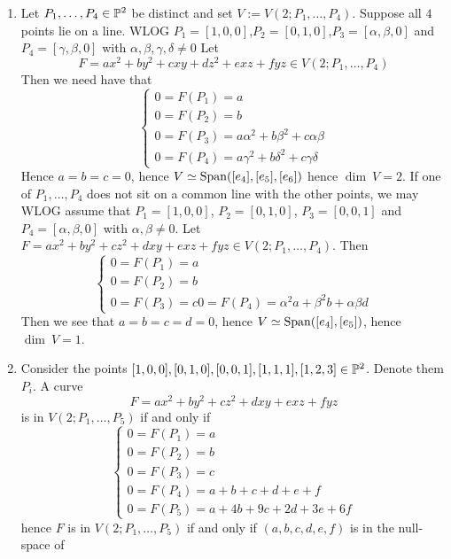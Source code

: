     \begin{example}
        \begin{enumerate}
            \item Let $P_1,\dots,P_4\in \mathbb{P}^2$ be distinct and set $V:= V(2; P_1,\dots,P_4)$. Suppose all $4$ points lie on a line. WLOG $P_1=[1,0,0]$,$P_2=[0,1,0]$,$P_3=[\alpha ,\beta ,0]$ and $P_4=[\gamma,\beta,0]$ with $\alpha,\beta,\gamma,\delta \neq 0$ Let 
            $$F=ax^2+by^2+cxy+dz^2+exz+fyz\in V(2;P_1,\dots,P_4)$$
            Then we need have that 
            $$\begin{cases}
                0=F(P_1)= a\\
                0=F(P_2)= b\\
                0=F(P_3)= a\alpha^2+b\beta^2+c\alpha\beta\\
                0=F(P_4)= a\gamma^2+b\delta^2+c\gamma\delta
            \end{cases}$$
            Hence $a=b=c=0$, hence $V\simeq \mathrm{Span}([e_4],[e_5],[e_6])$ hence $\dim \ V = 2$. 
            If one of $P_1,\dots,P_4$ does not sit on a common line with the other points, we may WLOG assume that $P_1 = [1,0,0]$, $P_2=[0,1,0]$, $P_3 = [0,0,1]$ and $P_4 = [\alpha,\beta,0]$ with $\alpha,\beta \neq 0$. Let $F= ax^2+by^2+cz^2+dxy+exz+fyz\in V(2;P_1,\dots,P_4)$. Then
            $$\begin{cases}
                0=F(P_1) = a\\
                0 = F(P_2) = b\\
                0 = F(P_3) = c
                0= F(P_4)= \alpha^2a+\beta^2b+ \alpha\beta d
            \end{cases}$$
            Then we see that $ a=b=c=d=0$, hence $V\simeq \mathrm{Span}([e_4],[e_5])$, hence $\dim\ V = 1$.
            \item Consider the points $[1,0,0],[0,1,0],[0,0,1],[1,1,1],[1,2,3]\in \mathbb{P}^2$. Denote them $P_i$. A curve  
            $$F= ax^2+by^2+cz^2+dxy+exz+fyz$$
            is in $V(2; P_1,\dots,P_5)$ if and only if  
            $$\begin{cases}
                0 = F(P_1) = a\\
                0 = F(P_2) = b\\
                0 = F(P_3) = c\\
                0 = F(P_4) = a+b+c+d+e+f\\
                0 = F(P_5) = a+4b+9c+2d+3e+6f
            \end{cases}$$
            hence $F$ is in $V(2;P_1,\dots,P_5)$ if and only if $(a,b,c,d,e,f)$ is in the null-space of 

\end{enumerate}
\end{example}
